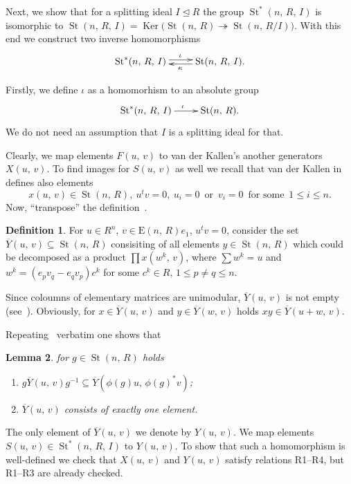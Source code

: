 \documentclass[11pt]{amsart}
\theoremstyle{plain} \declaretheorem[name=Theorem, Refname={Theorem,Theorems}]{tm} \Crefname{tm}{Theorem}{Theorems}
\numberwithin{equation}{section}
\newtheorem{lm}{Lemma} \numberwithin{lm}{section} \Crefname{lm}{Lemma}{Lemmas}
\theoremstyle{definition} \newtheorem{df}[lm]{Definition} \Crefname{df}{Definition}{Definitions}
\theoremstyle{remark} \newtheorem{rk}[lm]{Remark} \Crefname{rk}{Remark}{Remarks}
\newcommand{\Ker}{\mathop{\mathrm{Ker}}\nolimits}
\newcommand{\E}{{\mathrm{E}}}
\newcommand{\St}{\mathop{\mathrm{St}}\nolimits}
\newcommand{\epi}{\twoheadrightarrow}
\newcommand{\inv}{^{-1}}
\begin{document}
Next, we show that for a splitting ideal $I\trianglelefteq R$ the group $\St^*(n,\,R,\,I)$ is isomorphic to $\St(n,\,R,\,I)=\Ker\big(\St(n,\,R)\epi\St(n,\,R/I)\big)$. With this end we construct two inverse homomorphisms
$$
\xymatrix{
\St^*(n,\,R,\,I)\ar@<0.5ex>[r]^{\iota}&\St(n,\,R,\,I)\ar@<0.5ex>[l]^{\kappa}.
}
$$

Firstly, we define $\iota$ as a homomorhism to an absolute group
$$
\xymatrix{
\St^*(n,\,R,\,I)\ar@<0.0ex>[r]^{\iota}&\St(n,\,R).
}
$$
We do not need an assumption that $I$ is a splitting ideal for that.

Clearly, we map elements $F(u,\,v)$ to van der Kallen's another generators $X(u,\,v)$. To find images for $S(u,\,v)$ as well we recall that van der Kallen in~\cite[3.8--3.10]{vdK} defines also elements
$$
x(u,\,v)\in\St(n,\,R),\ u^tv=0,\ u_i=0\,\text{ or }\,v_i=0\,\text{ for some }\,1\leq i\leq n.
$$
Now, ``transpose'' the definition~\cite[3.13]{vdK}.

\begin{df}
For $u\in R^n$, $v\in\E(n,\,R)e_1$, $u^tv=0$, consider the set $\overline Y(u,\,v)\subseteq\St(n,\,R)$ consisiting of all elements $y\in\St(n,\,R)$ which could be decomposed as a product $\prod x(w^k,\,v)$, where $\sum w^k=u$ and $w^k=(e_pv_q-e_qv_p)c^k$ for some $c^k\in R$, $1\leq p\neq q\leq n$.
\end{df}

Since coloumns of elementary matrices are unimodular, $\overline Y(u,\,v)$ is not empty (see~\cite[3.1--3.2]{vdK}). Obviously, for $x\in\overline Y(u,\,v)$ and $y\in\overline Y(w,\,v)$ holds $xy\in\overline Y(u+w,\,v)$.

Repeating~\cite[3.14--3.15]{vdK} verbatim one shows that

\begin{lm}
for $g\in\St(n,\,R)$ holds
\begin{enumerate}
\item
$g\overline Y(u,\,v)g\inv\subseteq\overline Y(\phi(g)u,\,\phi(g)^*v)$;
\item
$\overline Y(u,\,v)$ consists of exactly one element.
\end{enumerate}
\end{lm}

The only element of $\overline Y(u,\,v)$ we denote by $Y(u,\,v)$. We map elements $S(u,\,v)\in\St^*(n,\,R,\,I)$ to $Y(u,\,v)$. To show that such a homomorphism is well-defined we check that $X(u,\,v)$ and $Y(u,\,v)$ satisfy relations R1--R4, but R1--R3 are already checked.
\end{document}
